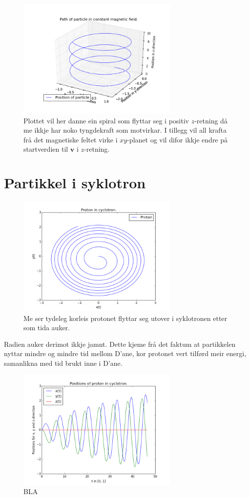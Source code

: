 \documentclass[11pt, a4paper]{article}
\begin{document}
  \begin{figure}[H]
    \centering
    \includegraphics[width=300px]{2A4.png}
    \caption{Plottet vil her danne ein spiral som flyttar seg i positiv $z$-retning då me ikkje har noko tyngdekraft som motvirkar. I tillegg vil all krafta frå det magnetiske 
    feltet virke i $xy$-planet og vil difor ikkje endre på startverdien til $\mathbf{v}$ i $z$-retning.}
  \end{figure}







\newpage
\section{Partikkel i syklotron}

  \begin{figure}[H]
    \centering
    \includegraphics[width=300px]{3A.png}
    \caption{Me ser tydeleg korleis protonet flyttar seg utover i syklotronen etter som tida auker.}
  \end{figure}
  Radien auker derimot ikkje jamnt. Dette kjeme frå det faktum at partikkelen nyttar mindre og mindre tid mellom D'ane, kor protonet vert tilførd meir energi, samanlikna med tid brukt 
  inne i D'ane. %

  \begin{figure}[H]
    \centering
    \includegraphics[width=300px]{3A1.png}
    \caption{BLA}
  \end{figure}
\end{document}
